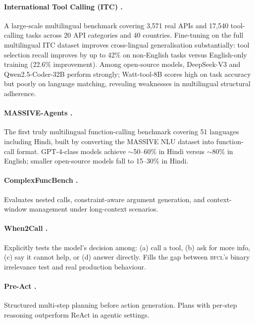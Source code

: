\documentclass[11pt]{article}
\newcommand{\bfcl}{\textsc{bfcl}}
\begin{document}
\paragraph{International Tool Calling (ITC) \citep{itc2025}.}
A large-scale multilingual benchmark covering 3,571 real APIs and 17,540 tool-calling tasks across
20 API categories and 40 countries. Fine-tuning on the full multilingual ITC dataset improves
cross-lingual generalisation substantially: tool selection recall improves by up to 42\% on
non-English tasks versus English-only training (22.6\% improvement). Among open-source models,
DeepSeek-V3 and Qwen2.5-Coder-32B perform strongly; Watt-tool-8B scores high on task accuracy but
poorly on language matching, revealing weaknesses in multilingual structural adherence.

\paragraph{MASSIVE-Agents \citep{massiveagents2025}.}
The first truly multilingual function-calling benchmark covering 51 languages including Hindi, built
by converting the MASSIVE NLU dataset into function-call format. GPT-4-class models achieve
$\sim$50--60\% in Hindi versus $\sim$80\% in English; smaller open-source models fall to
15--30\% in Hindi.

\paragraph{ComplexFuncBench \citep{zhong2025complexfuncbench}.}
Evaluates nested calls, constraint-aware argument generation, and context-window management under
long-context scenarios.

\paragraph{When2Call \citep{when2call2025}.}
Explicitly tests the model's decision among: (a) call a tool, (b) ask for more info, (c) say it
cannot help, or (d) answer directly. Fills the gap between \bfcl{}'s binary irrelevance test and
real production behaviour.

\paragraph{Pre-Act \citep{preact2025}.}
Structured multi-step planning before action generation. Plans with per-step reasoning outperform
ReAct in agentic settings.
\end{document}
